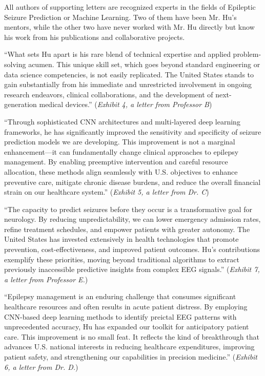 \documentclass{article}
\begin{document}
All authors of supporting letters are recognized experts in the fields of Epileptic Seizure Prediction or Machine Learning. Two of them have been Mr. Hu’s mentors, while the other two have never worked with Mr. Hu directly but know his work from his publications and collaborative projects. 

“What sets Hu apart is his rare blend of technical expertise and applied problem-solving acumen. This unique skill set, which goes beyond standard engineering or data science competencies, is not easily replicated. The United States stands to gain substantially from his immediate and unrestricted involvement in ongoing research endeavors, clinical collaborations, and the development of next-generation medical devices.” ({\it Exhibit 4, a letter from Professor B})

“Through sophisticated CNN architectures and multi-layered deep learning frameworks, he has significantly improved the sensitivity and specificity of seizure prediction models we are developing. This improvement is not a marginal enhancement—it can fundamentally change clinical approaches to epilepsy management. By enabling preemptive intervention and careful resource allocation, these methods align seamlessly with U.S. objectives to enhance preventive care, mitigate chronic disease burdens, and reduce the overall financial strain on our healthcare system.” ({\it Exhibit 5, a letter from Dr. C})

“The capacity to predict seizures before they occur is a transformative goal for neurology. By reducing unpredictability, we can lower emergency admission rates, refine treatment schedules, and empower patients with greater autonomy. The United States has invested extensively in health technologies that promote prevention, cost-effectiveness, and improved patient outcomes. Hu’s contributions exemplify these priorities, moving beyond traditional algorithms to extract previously inaccessible predictive insights from complex EEG signals.” ({\it Exhibit 7, a letter from Professor E.})

“Epilepsy management is an enduring challenge that consumes significant healthcare resources and often results in acute patient distress. By employing CNN-based deep learning methods to identify preictal EEG patterns with unprecedented accuracy, Hu has expanded our toolkit for anticipatory patient care. This improvement is no small feat. It reflects the kind of breakthrough that advances U.S. national interests in reducing healthcare expenditures, improving patient safety, and strengthening our capabilities in precision medicine.” ({\it Exhibit 6, a letter from Dr. D.})
\end{document}
